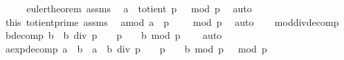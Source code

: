 \begin{isabellebody}
%
\isadelimproof
%
\endisadelimproof
%
\isatagproof
{}\isamarkupfalse%
\ {\isacharminus}{\kern0pt}\isanewline
\ \ \isamarkupfalse%
\ euler{\isacharunderscore}{\kern0pt}theorem\ assms{\isacharparenleft}{\kern0pt}{}{\isacharparenright}{\kern0pt}\ \isamarkupfalse%
\ {\isachardoublequoteopen}{\isacharbrackleft}{\kern0pt}a\ {\isacharcircum}{\kern0pt}\ {\isacharparenleft}{\kern0pt}totient\ p{\isacharparenright}{\kern0pt}\ {\isacharequal}{\kern0pt}\ {}{\isacharbrackright}{\kern0pt}\ {\isacharparenleft}{\kern0pt}mod\ p{\isacharparenright}{\kern0pt}{\isachardoublequoteclose}\ \isamarkupfalse%
\ auto\isanewline
\ \ \isamarkupfalse%
\ this\ totient{\isacharunderscore}{\kern0pt}prime\ assms{\isacharparenleft}{\kern0pt}{}{\isacharparenright}{\kern0pt}\ \isamarkupfalse%
\ a{\isacharunderscore}{\kern0pt}mod{\isacharunderscore}{\kern0pt}{}{\isacharcolon}{\kern0pt}\ {\isachardoublequoteopen}{\isacharbrackleft}{\kern0pt}a\ {\isacharcircum}{\kern0pt}\ {\isacharparenleft}{\kern0pt}p\ {\isacharminus}{\kern0pt}\ {}{\isacharparenright}{\kern0pt}\ {\isacharequal}{\kern0pt}\ {}{\isacharbrackright}{\kern0pt}\ {\isacharparenleft}{\kern0pt}mod\ p{\isacharparenright}{\kern0pt}{\isachardoublequoteclose}\ \isamarkupfalse%
\ auto\isanewline
\ \ \isamarkupfalse%
\ mod{\isacharunderscore}{\kern0pt}div{\isacharunderscore}{\kern0pt}decomp\ \isamarkupfalse%
\ b{\isacharunderscore}{\kern0pt}decomp{\isacharcolon}{\kern0pt}\ {\isachardoublequoteopen}b\ {\isacharequal}{\kern0pt}\ {\isacharparenleft}{\kern0pt}b\ div\ {\isacharparenleft}{\kern0pt}p\ {\isacharminus}{\kern0pt}\ {}{\isacharparenright}{\kern0pt}{\isacharparenright}{\kern0pt}\ {\isacharasterisk}{\kern0pt}\ {\isacharparenleft}{\kern0pt}p\ {\isacharminus}{\kern0pt}\ {}{\isacharparenright}{\kern0pt}\ {\isacharplus}{\kern0pt}\ {\isacharparenleft}{\kern0pt}b\ mod\ {\isacharparenleft}{\kern0pt}p\ {\isacharminus}{\kern0pt}\ {}{\isacharparenright}{\kern0pt}{\isacharparenright}{\kern0pt}{\isachardoublequoteclose}\ \isamarkupfalse%
\ auto\isanewline
\ \ \isamarkupfalse%
\ \isamarkupfalse%
\ a{\isacharunderscore}{\kern0pt}exp{\isacharunderscore}{\kern0pt}decomp{\isacharcolon}{\kern0pt}\ {\isachardoublequoteopen}{\isacharbrackleft}{\kern0pt}a\ {\isacharcircum}{\kern0pt}\ b\ {\isacharequal}{\kern0pt}\ a\ {\isacharcircum}{\kern0pt}\ {\isacharparenleft}{\kern0pt}{\isacharparenleft}{\kern0pt}b\ div\ {\isacharparenleft}{\kern0pt}p\ {\isacharminus}{\kern0pt}\ {}{\isacharparenright}{\kern0pt}{\isacharparenright}{\kern0pt}\ {\isacharasterisk}{\kern0pt}\ {\isacharparenleft}{\kern0pt}p\ {\isacharminus}{\kern0pt}\ {}{\isacharparenright}{\kern0pt}\ {\isacharplus}{\kern0pt}\ {\isacharparenleft}{\kern0pt}b\ mod\ {\isacharparenleft}{\kern0pt}p\ {\isacharminus}{\kern0pt}\ {}{\isacharparenright}{\kern0pt}{\isacharparenright}{\kern0pt}{\isacharparenright}{\kern0pt}{\isacharbrackright}{\kern0pt}\ {\isacharparenleft}{\kern0pt}mod\ p{\isacharparenright}{\kern0pt}{\isachardoublequoteclose}\ \isamarkupfalse%

\end{isabellebody}
